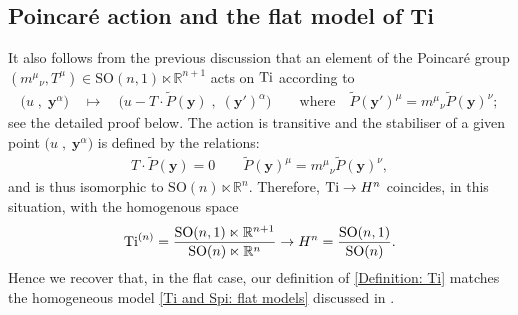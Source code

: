 \documentclass[a4paper, 10pt]{article}
\theoremstyle{remark}
\newcommand{\Ti}{\textnormal{Ti}}
\newcommand{\y}{\bm{y}}
\newcommand{\scal}{\cdot} %
\begin{document}
\subsection{Poincaré action and the flat model of Ti}\label{subsection: Poincaré action and the flat model of Ti}

It also follows from the previous discussion that an element of the Poincaré group $(m^{\mu}{}_{\nu}, T^{\mu}) \in \textrm{SO}(n,1) \ltimes \mathbb{R}^{n+1}$ acts on $\Ti$ according to
\begin{align*}
    \Big(u \;,\; \y^{\alpha}\Big) \quad \mapsto\quad  \Big(u - T\scal \tilde{P}(\y)\;,\; (\y')^{\alpha}\Big) \qquad \text{where} \quad \tilde{P}(\y')^{\mu} = m^{\mu}{}_{\nu}\tilde{P}(\y)^{\nu};
\end{align*}
see the detailed proof below. The action is transitive and the stabiliser of a given point $\Big(u \;,\; \y^{\alpha}\Big)$ is defined by the relations:
\begin{align*}
   T\scal \tilde{P}(\y) =0 \qquad  \tilde{P}(\y)^{\mu} = m^{\mu}{}_{\nu}\tilde{P}(\y)^{\nu},
\end{align*}
and is thus isomorphic to $\textrm{SO}(n) \ltimes \mathbb{R}^{n}$.  Therefore, $\Ti \to H^n$ coincides, in this situation, with the homogenous space
\begin{equation}
    \Ti^{(n)} = \frac{\textrm{SO}(n,1) \ltimes \mathbb{R}^{n+1}}{ \textrm{SO}(n) \ltimes \mathbb{R}^{n}} \to  H^n = \frac{\textrm{SO}(n,1) }{ \textrm{SO}(n)}.
\end{equation}
Hence we recover that, in the flat case, our definition of \eqref{Definition: Ti} matches the homogeneous model \eqref{Ti and Spi: flat models} discussed in \cite{Figueroa-OFarrill:2021sxz}.
\end{document}
